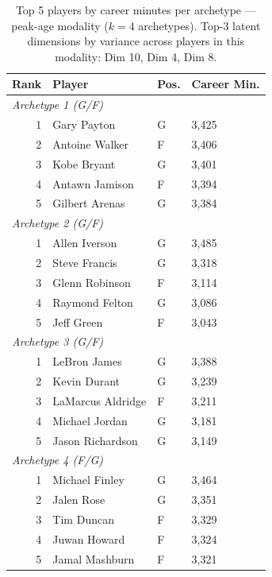 \begin{table}[htbp]
  \centering\small
  \begin{tabular}{rlll}
    \toprule
    Rank & Player & Pos. & Career Min. \\
    \midrule
    \multicolumn{4}{l}{\textit{Archetype 1 (G/F)}} \\
    \midrule
    1 & Gary Payton & G & 3,425 \\
    2 & Antoine Walker & F & 3,406 \\
    3 & Kobe Bryant & G & 3,401 \\
    4 & Antawn Jamison & F & 3,394 \\
    5 & Gilbert Arenas & G & 3,384 \\
    \midrule[0.4pt]
    \multicolumn{4}{l}{\textit{Archetype 2 (G/F)}} \\
    \midrule
    1 & Allen Iverson & G & 3,485 \\
    2 & Steve Francis & G & 3,318 \\
    3 & Glenn Robinson & F & 3,114 \\
    4 & Raymond Felton & G & 3,086 \\
    5 & Jeff Green & F & 3,043 \\
    \midrule[0.4pt]
    \multicolumn{4}{l}{\textit{Archetype 3 (G/F)}} \\
    \midrule
    1 & LeBron James & G & 3,388 \\
    2 & Kevin Durant & G & 3,239 \\
    3 & LaMarcus Aldridge & F & 3,211 \\
    4 & Michael Jordan & G & 3,181 \\
    5 & Jason Richardson & G & 3,149 \\
    \midrule[0.4pt]
    \multicolumn{4}{l}{\textit{Archetype 4 (F/G)}} \\
    \midrule
    1 & Michael Finley & G & 3,464 \\
    2 & Jalen Rose & G & 3,351 \\
    3 & Tim Duncan & F & 3,329 \\
    4 & Juwan Howard & F & 3,324 \\
    5 & Jamal Mashburn & F & 3,321 \\
    \bottomrule
  \end{tabular}
  \caption{Top 5 players by career minutes per archetype --- peak-age modality ($k=4$ archetypes). Top-3 latent dimensions by variance across players in this modality: Dim 10, Dim 4, Dim 8.}
  \label{tab:arch_reps_peak_age}
\end{table}

